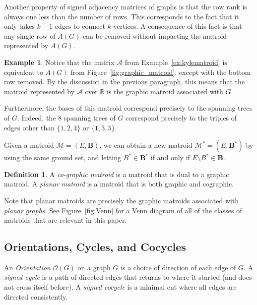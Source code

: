 \documentclass[12p]{amsart}
\numberwithin{equation}{section}
\theoremstyle{plain}
\theoremstyle{definition}
\newtheorem{defn}[thm]{Definition}
\newtheorem{ex}[thm]{Example}
\begin{document}
Another property of signed adjacency matrices of graphs is that the row rank is always one less than the number of rows. This corresponds to the fact that it only takes $k-1$ edges to connect $k$ vertices. A consequence of this fact is that any single row of $A(G)$ can be removed without impacting the matroid represented by $A(G)$. 

\begin{ex}\label{ex:remove_row}
    Notice that the matrix $\mathcal A$ from Example~\ref{ex:kylematroid} is equivalent to $A(G)$ from Figure~\ref{fig:graphic_matroid}, except with the bottom row removed. By the discussion in the previous paragraph, this means that the matroid represented by $\mathcal A$ over $\mathbb R$ is the graphic matroid associated with $G$. 

    Furthermore, the bases of this matroid correspond precisely to the spanning trees of $G$. Indeed, the 8 spanning trees of $G$ correspond precisely to the triples of edges other than $\{1,2,4\}$ or $\{1,3,5\}$.
\end{ex}

Given a matroid $\mathcal M = (E,\mathbf B)$, we can obtain a new matroid $\mathcal M^*=(E,\mathbf B^*)$ by using the same ground set, and letting $B^* \in \mathbf B^*$ if and only if $E \setminus B^* \in \mathbf B$. 

\begin{defn}
    A \emph{co-graphic matroid} is a matroid that is dual to a graphic matroid. A \emph{planar matroid} is a matroid that is both graphic and cographic. 
\end{defn}

Note that planar matroids are precisely the graphic matroids associated with \emph{planar graphs}. See Figure~\ref{fig:Venn} for a Venn diagram of all of the classes of matroids that are relevant in this paper. 





\subsection{Orientations, Cycles, and Cocycles} 

An \emph{Orientation} $\mathcal O(G)$ on a graph $G$ is a choice of direction of each edge of $G$. A \emph{signed cycle} is a path of directed edges that returns to where it started (and does not cross itself before). A \emph{signed cocycle} is a minimal cut where all edges are directed consistently. 
\end{document}
